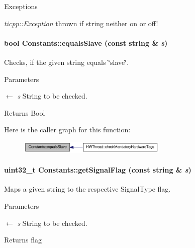 \begin{DoxyExceptions}{Exceptions}
\item[{\em ticpp::Exception}]thrown if string neither on or off! \end{DoxyExceptions}
\hypertarget{class_constants_a55fe8c5ab386f56f6860f9c153800219}{
\paragraph[{equalsSlave}]{\setlength{\rightskip}{0pt plus 5cm}bool Constants::equalsSlave (const string \& {\em s})}\hfill}
\label{class_constants_a55fe8c5ab386f56f6860f9c153800219}


Checks, if the given string equals \char`\"{}slave\char`\"{}. 
\begin{DoxyParams}{Parameters}
\item[\mbox{$\leftarrow$} {\em s}]String to be checked. \end{DoxyParams}
\begin{DoxyReturn}{Returns}
Bool 
\end{DoxyReturn}


Here is the caller graph for this function:\nopagebreak
\begin{figure}[H]
\begin{center}
\leavevmode
\includegraphics[width=201pt]{class_constants_a55fe8c5ab386f56f6860f9c153800219_icgraph}
\end{center}
\end{figure}
\hypertarget{class_constants_a381d9729953ee019bca64e42d89005e7}{
\paragraph[{getSignalFlag}]{\setlength{\rightskip}{0pt plus 5cm}uint32\_\-t Constants::getSignalFlag (const string \& {\em s})}\hfill}
\label{class_constants_a381d9729953ee019bca64e42d89005e7}


Maps a given string to the respective SignalType flag. 
\begin{DoxyParams}{Parameters}
\item[\mbox{$\leftarrow$} {\em s}]String to be checked. \end{DoxyParams}
\begin{DoxyReturn}{Returns}
flag 
\end{DoxyReturn}

